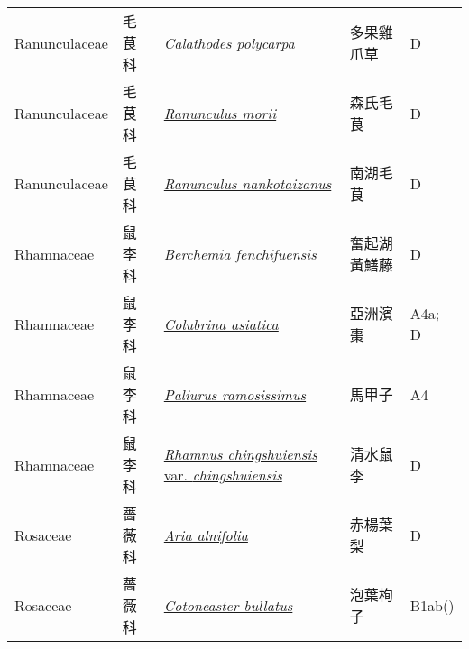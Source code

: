 {\begin{longtable}{L{2.5cm}L{2cm}L{5cm}L{2.5cm}L{3cm}}
    Ranunculaceae & 毛茛科 & \href{http://www.theplantlist.org/tpl1.1/search?q=Calathodes+polycarpa}{\textit{Calathodes polycarpa} } & 多果雞爪草 & D    \\
    Ranunculaceae & 毛茛科 & \href{http://www.theplantlist.org/tpl1.1/search?q=Ranunculus+morii}{\textit{Ranunculus morii} } & 森氏毛茛 & D    \\
    Ranunculaceae & 毛茛科 & \href{http://www.theplantlist.org/tpl1.1/search?q=Ranunculus+nankotaizanus}{\textit{Ranunculus nankotaizanus} } & 南湖毛茛 & D    \\
    Rhamnaceae & 鼠李科 & \href{http://www.theplantlist.org/tpl1.1/search?q=Berchemia+fenchifuensis}{\textit{Berchemia fenchifuensis} } & 奮起湖黃鱔藤 & D    \\
    Rhamnaceae & 鼠李科 & \href{http://www.theplantlist.org/tpl1.1/search?q=Colubrina+asiatica}{\textit{Colubrina asiatica} } & 亞洲濱棗 & A4a; D    \\
    Rhamnaceae & 鼠李科 & \href{http://www.theplantlist.org/tpl1.1/search?q=Paliurus+ramosissimus}{\textit{Paliurus ramosissimus} } & 馬甲子 & A4    \\
    Rhamnaceae & 鼠李科 & \href{http://www.theplantlist.org/tpl1.1/search?q=Rhamnus+chingshuiensis+var.+chingshuiensis}{\textit{Rhamnus chingshuiensis} var. \textit{chingshuiensis} } & 清水鼠李 & D    \\
    Rosaceae & 薔薇科 & \href{http://www.theplantlist.org/tpl1.1/search?q=Aria+alnifolia}{\textit{Aria alnifolia} } & 赤楊葉梨 & D    \\
    Rosaceae & 薔薇科 & \href{http://www.theplantlist.org/tpl1.1/search?q=Cotoneaster+bullatus}{\textit{Cotoneaster bullatus} } & 泡葉栒子 & B1ab()    \\

\end{longtable}}
